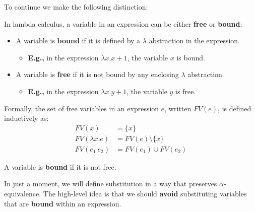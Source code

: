\noindent
To continue we make the following distinction:
\begin{Def}

    In lambda calculus, a variable in an expression can be either \textbf{free} or \textbf{bound}:
    
    \begin{itemize}
      \item A variable is \textbf{bound} if it is defined by a $\lambda$ abstraction in the expression. 
      \begin{itemize}
        \item \textbf{E.g.,} in the expression $\lambda x. x + 1$, the variable $x$ is bound.
      \end{itemize}
      \item A variable is \textbf{free} if it is not bound by any enclosing $\lambda$ abstraction.
        \begin{itemize}
            \item \textbf{E.g.,} in the expression $\lambda x. y + 1$, the variable $y$ is free.
        \end{itemize} 
    \end{itemize}
    
    \noindent
    Formally, the set of free variables in an expression $e$, written $\mathit{FV}(e)$, is defined inductively as:
    \[
    \begin{aligned}
      \mathit{FV}(x) & = \{x\} \\
      \mathit{FV}(\lambda x. e) & = \mathit{FV}(e) \setminus \{x\} \\
      \mathit{FV}(e_1\ e_2) & = \mathit{FV}(e_1) \cup \mathit{FV}(e_2)
    \end{aligned}
    \]
    
    \noindent
    A variable is \textbf{bound} if it is not free.
    
    \end{Def}



    \noindent
    In just a moment, we will define substitution in a way that preserves $\alpha$-equivalence. 
    The high-level idea is that we should \textbf{avoid} substituting variables that are \textbf{bound} within an expression.
    
\newpage

